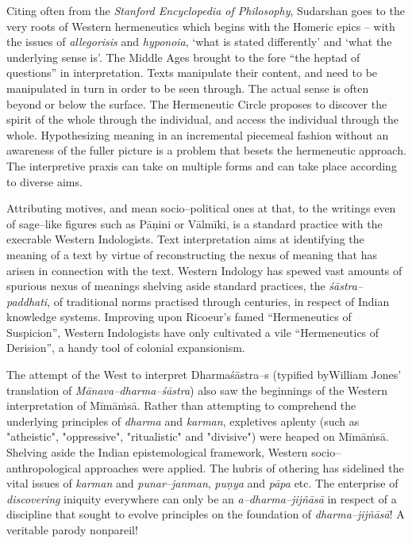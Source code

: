 Citing often from the \textit{Stanford Encyclopedia of Philosophy}, Sudarshan goes to the very roots of Western hermeneutics which begins with the Homeric epics – with the issues of \textit{allegorisis} and \textit{hyponoia}, ‘what is stated differently’ and ‘what the underlying sense is’. The Middle Ages brought to the fore “the heptad of questions” in interpretation. Texts manipulate their content, and need to be manipulated in turn in order to be seen through. The actual sense is often beyond or below the surface. The Hermeneutic Circle proposes to discover the spirit of the whole through the individual, and access the individual through the whole. Hypothesizing meaning in an incremental piecemeal fashion without an awareness of the fuller picture is a problem that besets the hermeneutic approach. The interpretive praxis can take on multiple forms and can take place according to diverse aims.

 Attributing motives, and mean socio–political ones at that, to the writings even of sage–like figures such as Pāṇini or Vālmīki, is a standard practice with the execrable Western Indologists. Text interpretation aims at identifying the meaning of a text by virtue of reconstructing the nexus of meaning that has arisen in connection with the text. Western Indology has spewed vast amounts of spurious nexus of meanings shelving aside standard practices, the \textit{śāstra–paddhati}, of traditional norms practised through centuries, in respect of Indian knowledge systems. Improving upon Ricoeur’s famed “Hermeneutics of Suspicion”, Western Indologists have only cultivated a vile “Hermeneutics of Derision”, a handy tool of colonial expansionism. 

The attempt of the West to interpret Dharmaśāstra–s (typified by\break William Jones’ translation of \textit{Mānava–dharma–śāstra}) also saw the beginnings of the Western interpretation of Mīmāṁsā. Rather than attempting to comprehend the underlying principles of \textit{dharma} and \textit{karman}, expletives aplenty (such as "atheistic", "oppressive", "ritualistic" and "divisive") were heaped on Mīmāṁsā. Shelving aside the Indian epistemological framework, Western socio–anthropological approaches were applied. The hubris of othering has sidelined the vital issues of \textit{karman} and \textit{punar–janman}, \textit{puṇya} and \textit{pāpa} etc. The enterprise of \textit{discovering} iniquity everywhere can only be an \textit{a–dharma–jijñāsā} in respect of a discipline that sought to evolve principles on the foundation of \textit{dharma–jijñāsā}! A veritable parody nonpareil!

